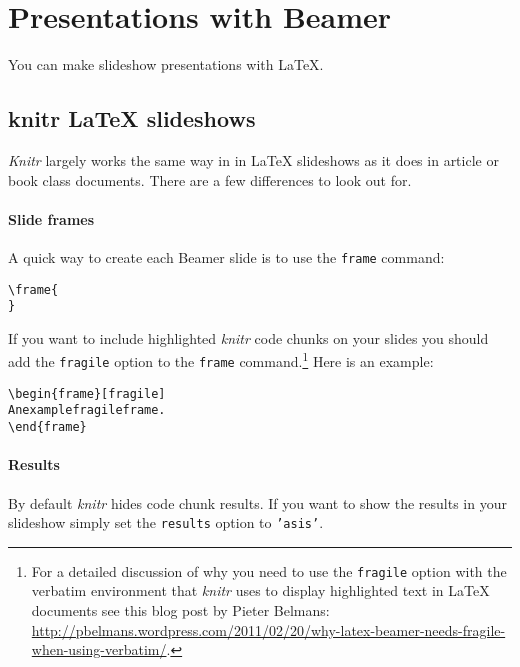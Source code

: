 \section{Presentations with Beamer}

You can make slideshow presentations with LaTeX. 

\subsection{knitr LaTeX slideshows}
{\emph{Knitr}} largely works the same way in in LaTeX slideshows as it does in article or book class documents. There are a few differences to look out for. 

\paragraph{Slide frames}

A quick way to create each Beamer slide is to use the \texttt{frame} command:

\begin{knitrout}
\color{fgcolor}\begin{kframe}
\begin{alltt}
\textbackslash{}frame\{
\}
\end{alltt}
\end{kframe}
\end{knitrout}


\noindent If you want to include highlighted {\emph{knitr}} code chunks on your slides you should add the \texttt{fragile} option to the \texttt{frame} command.\footnote{For a detailed discussion of why you need to use the \texttt{fragile} option with the verbatim environment that {\emph{knitr}} uses to display highlighted text in LaTeX documents see this blog post by Pieter Belmans: \url{http://pbelmans.wordpress.com/2011/02/20/why-latex-beamer-needs-fragile-when-using-verbatim/}.} Here is an example:

\begin{knitrout}
\color{fgcolor}\begin{kframe}
\begin{alltt}
\textbackslash{}begin\{frame\}[fragile]
    An example fragile frame.
\textbackslash{}end\{frame\}
\end{alltt}
\end{kframe}
\end{knitrout}


\paragraph{Results}

By default {\emph{knitr}} hides code chunk results. If you want to show the results in your slideshow simply set the {\tt{results}} option to {\tt{'asis'}}.
